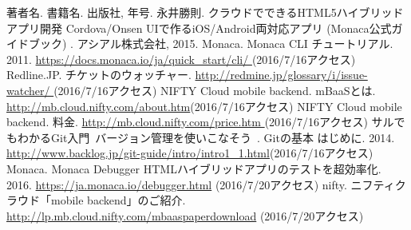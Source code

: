 \documentclass[openany,11pt,papersize]{jsbook}
\begin{document}
%
\maketitle

\frontmatter



\tableofcontents%


\mainmatter%



















\begin{appendix}





\end{appendix}



\begin{thebibliography}{9}
 著者名. 書籍名. 出版社,  年号.
 永井勝則. クラウドでできるHTML5ハイブリッドアプリ開発 Cordova/Onsen UIで作るiOS/Android両対応アプリ (Monaca公式ガイドブック) . アシアル株式会社, 2015.
 Monaca. Monaca CLI チュートリアル. 2011. \url{https://docs.monaca.io/ja/quick_start/cli/ }(2016/7/16アクセス)
 Redline.JP. チケットのウォッチャー. \url{http://redmine.jp/glossary/i/issue-watcher/ }(2016/7/16アクセス)
 NIFTY Cloud mobile backend. mBaaSとは. \url{http://mb.cloud.nifty.com/about.htm}(2016/7/16アクセス)
 NIFTY Cloud mobile backend. 料金. \url{http://mb.cloud.nifty.com/price.htm }(2016/7/16アクセス)
 サルでもわかるGit入門~バージョン管理を使いこなそう~. Gitの基本 はじめに. 2014. \url{http://www.backlog.jp/git-guide/intro/intro1_1.html}(2016/7/16アクセス)
 Monaca. Monaca Debugger HTMLハイブリッドアプリのテストを超効率化. 2016. \url{https://ja.monaca.io/debugger.html} (2016/7/20アクセス)
 nifty. ニフティクラウド「mobile backend」のご紹介. \url{http://lp.mb.cloud.nifty.com/mbaaspaperdownload} (2016/7/20アクセス)
\end{thebibliography}
\end{document}
